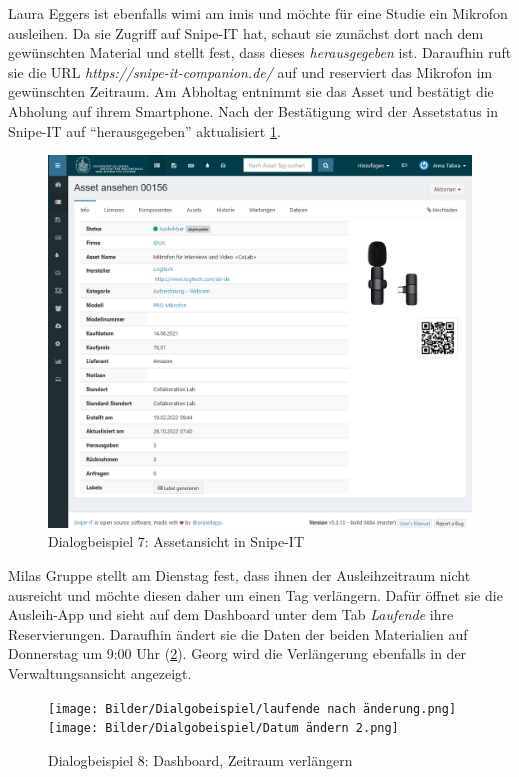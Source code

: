 \newpage
Laura Eggers ist ebenfalls \ac{wimi} am \ac{imis} und möchte für eine
Studie ein Mikrofon ausleihen. Da sie Zugriff auf Snipe-IT hat, schaut sie
zunächst dort nach dem gewünschten Material und stellt fest, dass dieses
\textit{herausgegeben} ist. Daraufhin ruft sie die URL
\textit{https://snipe-it-companion.de/} auf und reserviert das Mikrofon im
gewünschten Zeitraum. Am Abholtag entnimmt sie das Asset und bestätigt die
Abholung auf ihrem Smartphone. Nach der Bestätigung wird der Assetstatus in
Snipe-IT auf \enquote{herausgegeben} aktualisiert \ref{fig:georg5}. 
\begin{figure}[h]
    \centering
    \includegraphics[scale=0.42]{Bilder/snipeit.png}
    \caption{Dialogbeispiel 7: Assetansicht in Snipe-IT}\label{fig:georg5}
\end{figure}

\newpage
Milas Gruppe stellt am Dienstag fest, dass ihnen der Ausleihzeitraum nicht
ausreicht und möchte diesen daher um einen Tag verlängern. Dafür öffnet sie die
Ausleih-App und sieht auf dem Dashboard unter dem Tab \textit{Laufende} ihre
Reservierungen. Daraufhin ändert sie die Daten der beiden Materialien auf
Donnerstag um 9:00 Uhr (\ref{fig:andern}). Georg wird die Verlängerung ebenfalls
in der Verwaltungsansicht angezeigt.
\begin{figure}[h]
    \centering
    \texttt{[image: Bilder/Dialgobeispiel/laufende nach änderung.png]}
    \texttt{[image: Bilder/Dialgobeispiel/Datum ändern 2.png]}
    \caption{Dialogbeispiel 8: Dashboard, Zeitraum verlängern}\label{fig:andern}
\end{figure}

